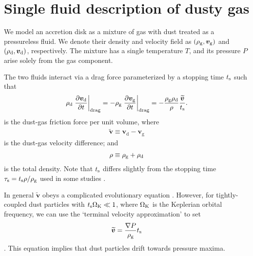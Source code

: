 \section{Single fluid description of dusty gas}\label{setup} 
We model an accretion disk as a mixture of gas with dust treated as a 
pressureless fluid. We denote their density and
velocity field as $(\rho_\mathrm{g},\bm{v}_\mathrm{g})$ and
$(\rho_\mathrm{d},\bm{v}_\mathrm{d})$, respectively. The mixture has a single 
temperature $T$, and its pressure $P$ arise solely from the 
gas component. %

The two fluids interact via a drag force parameterized by a stopping
time $t_\mathrm{s}$ 
such that 
\begin{align}  
  \rho_\mathrm{d}\left.\frac{\partial \bm{v}_\mathrm{d}}{\partial t}\right|_\mathrm{drag}= -
  \rho_\mathrm{g}\left.\frac{\partial \bm{v}_\mathrm{g}}{\partial t}\right|_\mathrm{drag}=
  - \frac{\rho_\mathrm{g}\rho_\mathrm{d}}{\rho}\frac{\widetilde{\bm{v}}}{t_\mathrm{s}}. 
\end{align}
is the dust-gas friction force per unit volume, where
\begin{align}
  \widetilde{\bm{v}} \equiv\bm{v}_\mathrm{d} - \bm{v}_\mathrm{g} 
\end{align}
is the dust-gas velocity difference; and 
\begin{align}
  \rho \equiv \rho_\mathrm{g} + \rho_\mathrm{d}
\end{align}
is the total density. 
Note that $t_\mathrm{s}$ 
differs slightly from the stopping time $\tau_\mathrm{s} =
t_\mathrm{s}\rho/\rho_\mathrm{g}$ used in some studies
\citep[e.g.][]{youdin05a,jacquet11}.   

In general $\widetilde{\bm{v}}$ obeys a complicated evolutionary equation
\citep[see, e.g.][]{youdin05a}. However, for tightly-coupled dust
particles with $t_\mathrm{s}\Omega_{\rm K}\ll 1 $, where $\Omega_{\rm K}$ is the Keplerian orbital
frequency, we can use the 
`terminal velocity approximation' to set %
\begin{align}
  \widetilde{\bm{v}} = \frac{\nabla
    P}{\rho_\mathrm{g}}t_\mathrm{s} 
\end{align}
\citep{jacquet11}. This equation implies that dust particles
drift towards pressure maxima. 


